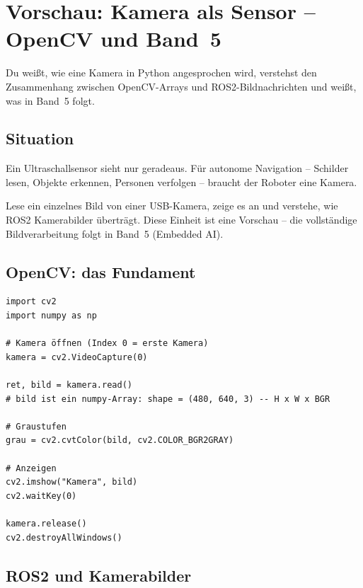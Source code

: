 \chapter{Vorschau: Kamera als Sensor – OpenCV und Band~5}

\begin{lernziele}
Du weißt, wie eine Kamera in Python angesprochen wird,
verstehst den Zusammenhang zwischen OpenCV-Arrays
und ROS2-Bildnachrichten und weißt, was in Band~5 folgt.
\end{lernziele}

\section{Situation}

Ein Ultraschallsensor sieht nur geradeaus.
Für autonome Navigation -- Schilder lesen, Objekte erkennen,
Personen verfolgen -- braucht der Roboter eine Kamera.

\begin{aufgabeBox}
Lese ein einzelnes Bild von einer USB-Kamera,
zeige es an und verstehe, wie ROS2 Kamerabilder überträgt.
Diese Einheit ist eine Vorschau -- die vollständige Bildverarbeitung
folgt in Band~5 (Embedded AI).
\end{aufgabeBox}

\section{OpenCV: das Fundament}

\begin{lstlisting}
import cv2
import numpy as np

# Kamera öffnen (Index 0 = erste Kamera)
kamera = cv2.VideoCapture(0)

ret, bild = kamera.read()
# bild ist ein numpy-Array: shape = (480, 640, 3) -- H x W x BGR

# Graustufen
grau = cv2.cvtColor(bild, cv2.COLOR_BGR2GRAY)

# Anzeigen
cv2.imshow("Kamera", bild)
cv2.waitKey(0)

kamera.release()
cv2.destroyAllWindows()
\end{lstlisting}

\section{ROS2 und Kamerabilder}

